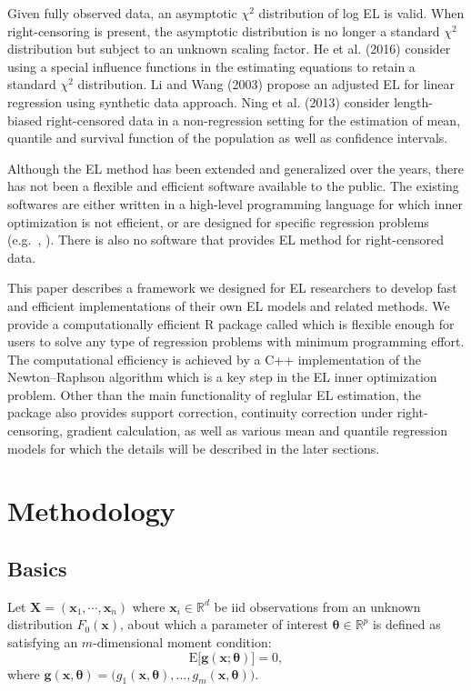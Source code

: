 \documentclass[article]{jss}
\renewcommand{\|}{\,|\,}
\begin{document}
Given fully observed data, an asymptotic \(\chi^2\) distribution of log EL is valid. When right-censoring is present, the asymptotic distribution is no longer a standard \(\chi^2\) distribution but subject to an unknown scaling factor. He et al. (2016) consider using a special influence functions in the estimating equations to retain a standard \(\chi^2\) distribution. Li and Wang (2003) propose an adjusted EL for linear regression using synthetic data approach. Ning et al. (2013) consider length-biased right-censored data in a non-regression setting for the estimation of mean, quantile and survival function of the population as well as confidence intervals.

Although the EL method has been extended and generalized over the years, there has not been a flexible and efficient software available to the public. The existing softwares are either written in a high-level programming language for which inner optimization is not efficient, or are designed for specific regression problems (e.g.~, ). There is also no software that provides EL method for right-censored data.

This paper describes a framework we designed for EL researchers to develop fast and efficient implementations of their own EL models and related methods. We provide a computationally efficient R package called  which is flexible enough for users to solve any type of regression problems with minimum programming effort. The computational efficiency is achieved by a C++ implementation of the Newton--Raphson algorithm which is a key step in the EL inner optimization problem. Other than the main functionality of reglular EL estimation, the package also provides support correction, continuity correction under right-censoring, gradient calculation, as well as various mean and quantile regression models for which the details will be described in the later sections.

\hypertarget{methodology}{%
\section{Methodology}\label{methodology}}

\hypertarget{basics}{%
\subsection{Basics}\label{basics}}

Let \(\bm X= (\bm x_1,\cdots,\bm x_n)\) where \(\bm x_i\in\mathbb R^d\) be iid observations from an unknown distribution \(F_0(\bm x)\), about which a parameter of interest \(\bm \theta\in \mathbb R^p\) is defined as satisfying an \(m\)-dimensional moment condition:
\begin{equation} \label{eq:momcond}
  \textrm{E}\bigl[\bm g(\bm x;\bm \theta)\bigr] = 0,
\end{equation}
where \(\bm g(\bm x, \bm \theta) = \bigl( g_1(\bm x, \bm \theta), \ldots, g_m(\bm x, \bm \theta) \bigr)\).
\end{document}

